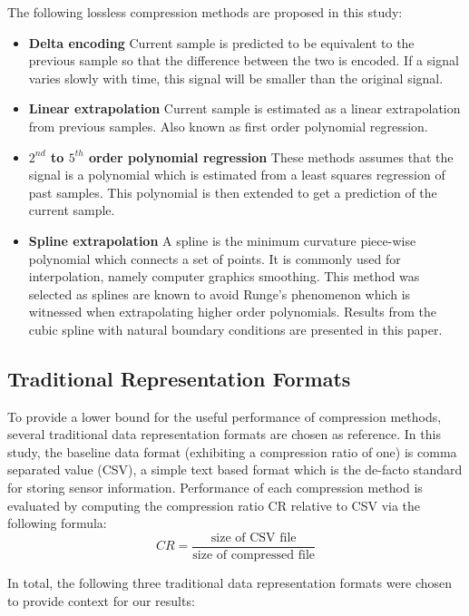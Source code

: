\documentclass[journal]{IEEEtran}
\begin{document}
The following lossless compression methods are proposed in this study:
\begin{itemize}
  \item \textbf{Delta encoding} Current sample is predicted to be equivalent to the previous sample so that the difference between the two is encoded. If a signal varies slowly with time, this signal will be smaller than the original signal.
  \item \textbf{Linear extrapolation} Current sample is estimated as a linear extrapolation from previous samples. Also known as first order polynomial regression.
  \item \textbf{\boldmath$2^{nd}$ to \boldmath$5^{th}$ order polynomial regression} These methods assumes that the signal is a polynomial which is estimated from a least squares regression of past samples. This polynomial is then extended to get a prediction of the current sample.
  \item \textbf{Spline extrapolation} A spline is the minimum curvature piece-wise polynomial which connects a set of points. It is commonly used for interpolation, namely computer graphics smoothing. This method was selected as splines are known to avoid Runge's phenomenon which is witnessed when extrapolating higher order polynomials. Results from the cubic spline with natural boundary conditions are presented in this paper.
\end{itemize}


\subsection{Traditional Representation Formats}
To provide a lower bound for the useful performance of compression methods, several traditional data representation formats are chosen as reference. In this study, the baseline data format (exhibiting a compression ratio of one) is comma separated value (CSV), a simple text based format which is the de-facto standard for storing sensor information. Performance of each compression method is evaluated by computing the compression ratio CR relative to CSV via the following formula:
$$CR = \frac{\textrm{size of CSV file}}{\textrm{size of compressed file}}$$

In total, the following three traditional data representation formats were chosen to provide context for our results:
\end{document}
